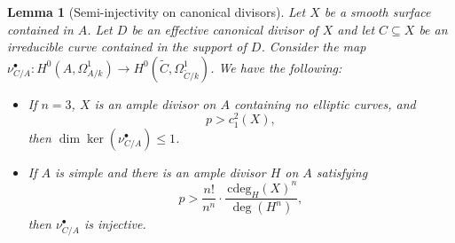 \documentclass[11pt]{amsart}
\newtheorem{lemma}[theorem]{Lemma}
\theoremstyle{remark}
\numberwithin{equation}{section}
\newcommand{\cdeg}{\,\mathrm{cdeg}}
\begin{document}
\begin{lemma}[Semi-injectivity on canonical divisors]\label{LemmaSemiInj} Let $X$ be a smooth surface contained in $A$. Let $D$ be an effective canonical divisor of $X$ and let $C\subseteq X$ be an irreducible curve contained in the support of $D$. Consider the map $\nu_{C/A}^\bullet: H^0(A,\Omega^1_{A/k})\to H^0(\widetilde{C},\Omega^1_{\widetilde{C}/k})$. We have the following:
\begin{itemize}
\item[(i)] If $n=3$, $X$ is an ample divisor on $A$ containing no elliptic curves, and %
\begin{equation}\label{EqnSemi1}
p> c_1^2(X),
\end{equation} 
then $\dim \ker(\nu_{C/A}^\bullet)\le 1$. 
\item[(ii)] If $A$ is simple and there is an ample divisor $H$ on $A$ satisfying 
\begin{equation}\label{EqnSemi2}
p>\frac{n!}{n^n}\cdot \frac{\cdeg_H(X)^n}{\deg(H^n)},
\end{equation} 
then $\nu_{C/A}^\bullet$ is injective.
\end{itemize} 
\end{lemma}
\end{document}
